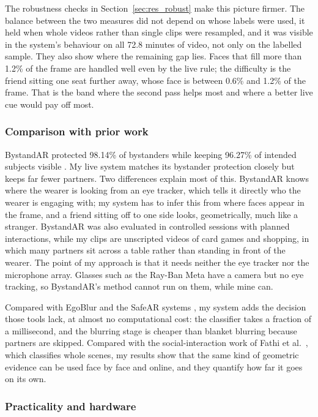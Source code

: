 The robustness checks in Section~\ref{sec:res_robust} make this picture firmer. The
balance between the two measures did not depend on whose labels were used, it held when
whole videos rather than single clips were resampled, and it was visible in the system's
behaviour on all 72.8 minutes of video, not only on the labelled sample. They also show
where the remaining gap lies. Faces that fill more than 1.2\% of the frame are handled
well even by the live rule; the difficulty is the friend sitting one seat further away,
whose face is between 0.6\% and 1.2\% of the frame. That is the band where the second pass
helps most and where a better live cue would pay off most.

\subsubsection{Comparison with prior work}
\label{sec:disc_prior}

BystandAR protected 98.14\% of bystanders while keeping 96.27\% of intended subjects
visible \cite{bystandar}. My live system matches its bystander protection closely but keeps
far fewer partners. Two differences explain most of this. BystandAR knows where the wearer
is looking from an eye tracker, which tells it directly who the wearer is engaging with; my
system has to infer this from where faces appear in the frame, and a friend sitting off to
one side looks, geometrically, much like a stranger. BystandAR was also evaluated in
controlled sessions with planned interactions, while my clips are unscripted videos of
card games and shopping, in which many partners sit across a table rather than standing in
front of the wearer. The point of my approach is that it needs neither the eye tracker nor
the microphone array. Glasses such as the Ray-Ban Meta have a camera but no eye tracking, so
BystandAR's method cannot run on them, while mine can.

Compared with EgoBlur and the SafeAR systems \cite{egoblur2023,safear2025,safearunity2025},
my system adds the decision those tools lack, at almost no computational cost: the
classifier takes a fraction of a millisecond, and the blurring stage is cheaper than
blanket blurring because partners are skipped. Compared with the social-interaction work of
Fathi et al.\ \cite{fathi2012social}, which classifies whole scenes, my results show that
the same kind of geometric evidence can be used face by face and online, and they quantify
how far it goes on its own.

\subsubsection{Practicality and hardware}
\label{sec:disc_hw}

